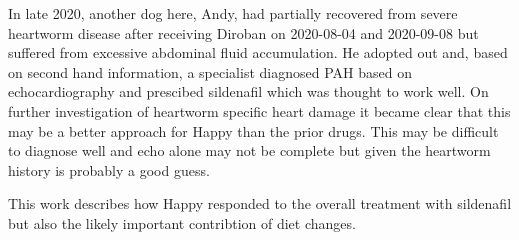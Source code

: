 

In late 2020, another dog here, Andy, had partially recovered
from severe heartworm disease after receiving Diroban on 
2020-08-04 and 2020-09-08 but suffered from excessive abdominal
fluid accumulation.
He adopted out and, based on second hand information,  a specialist
diagnosed  PAH based on echocardiography  and prescibed sildenafil  
which was thought to work well.  
On further investigation of heartworm specific heart damage
it became clear that this may be a better approach for Happy
than the prior drugs. 
This may be difficult to diagnose well and echo alone may not be complete  
\cite{TopyaPutowska_Tomaszewski_Wysokiski_Echocardiography_Pulmonary_Arterial_2021}
but given the heartworm history is probably  a good guess.

This work describes how Happy responded to the overall treatment
with sildenafil but also the likely important contribtion of diet
changes. 


